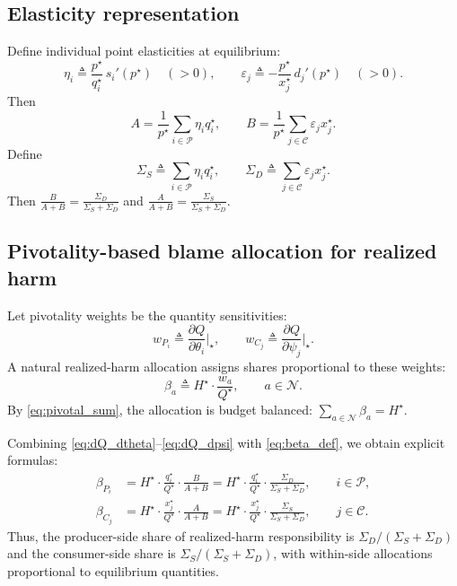 \documentclass[journal, a4paper]{IEEEtran}
\begin{document}
\subsection{Elasticity representation}
Define individual point elasticities at equilibrium:
\begin{equation}
\eta_i \triangleq \frac{p^\star}{q_i^\star}\,s_i'(p^\star)\quad(>0),\qquad
\varepsilon_j \triangleq -\frac{p^\star}{x_j^\star}\,d_j'(p^\star)\quad(>0).
\end{equation}
Then
\begin{equation}
A=\frac{1}{p^\star}\sum_{i\in\mathcal{P}}\eta_i q_i^\star,\qquad
B=\frac{1}{p^\star}\sum_{j\in\mathcal{C}}\varepsilon_j x_j^\star.
\label{eq:AB_elast}
\end{equation}
Define
\begin{equation}
\Sigma_S \triangleq \sum_{i\in\mathcal{P}}\eta_i q_i^\star,\qquad
\Sigma_D \triangleq \sum_{j\in\mathcal{C}}\varepsilon_j x_j^\star.
\label{eq:SigmaSD}
\end{equation}
Then $\frac{B}{A+B}=\frac{\Sigma_D}{\Sigma_S+\Sigma_D}$ and $\frac{A}{A+B}=\frac{\Sigma_S}{\Sigma_S+\Sigma_D}$.

\subsection{Pivotality-based blame allocation for realized harm}
Let pivotality weights be the quantity sensitivities:
\begin{equation}
w_{P_i}\triangleq \frac{\partial Q}{\partial \theta_i}\Big|_\star,\qquad
w_{C_j}\triangleq \frac{\partial Q}{\partial \psi_j}\Big|_\star.
\end{equation}
A natural realized-harm allocation assigns shares proportional to these weights:
\begin{equation}
\beta_a \triangleq H^\star\cdot \frac{w_a}{Q^\star},\qquad a\in\mathcal{N}.
\label{eq:beta_def}
\end{equation}
By \eqref{eq:pivotal_sum}, the allocation is budget balanced: $\sum_{a\in\mathcal{N}}\beta_a=H^\star$.

Combining \eqref{eq:dQ_dtheta}--\eqref{eq:dQ_dpsi} with \eqref{eq:beta_def}, we obtain explicit formulas:
\begin{align}
\beta_{P_i}
&=
H^\star\cdot \frac{q_i^\star}{Q^\star}\cdot \frac{B}{A+B}
=
H^\star\cdot \frac{q_i^\star}{Q^\star}\cdot \frac{\Sigma_D}{\Sigma_S+\Sigma_D},
\qquad i\in\mathcal{P},
\label{eq:beta_prod}\\
\beta_{C_j}
&=
H^\star\cdot \frac{x_j^\star}{Q^\star}\cdot \frac{A}{A+B}
=
H^\star\cdot \frac{x_j^\star}{Q^\star}\cdot \frac{\Sigma_S}{\Sigma_S+\Sigma_D},
\qquad j\in\mathcal{C}.
\label{eq:beta_cons}
\end{align}
Thus, the producer-side share of realized-harm responsibility is $\Sigma_D/(\Sigma_S+\Sigma_D)$ and the consumer-side share is $\Sigma_S/(\Sigma_S+\Sigma_D)$, with within-side allocations proportional to equilibrium quantities.
\end{document}
